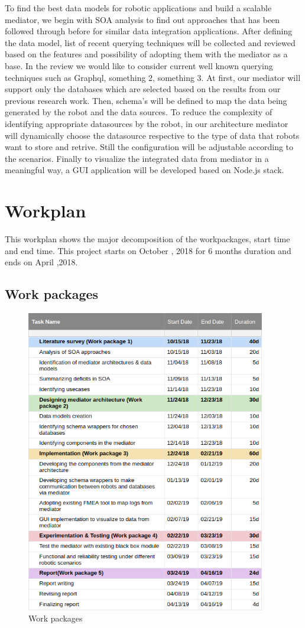 \documentclass[12pt]{article}
\begin{document}
To find the best data models for robotic applications and build a scalable mediator, we begin with SOA analysis to find out approaches that has been followed through before for similar data integration applications. After defining the data model, list of recent querying techniques will be collected and reviewed based on the features and possibility of adopting them with the mediator as a base. In the review we would like to consider current well known querying techniques such as Graphql, something 2, something 3. At first, our mediator will support only the databases which are selected based on the results from our previous research work. Then, schema's will be defined to map the data being generated by the robot and the data sources. To reduce the complexity of identifying appropriate datasources by the robot, in our architecture mediator will dynamically choose the datasource respective to the type of data that robots want to store and retrive. Still the configuration will be adjustable according to the scenarios. Finally to visualize the integrated data from mediator in a meaningful way, a GUI application will be developed based on Node.js stack.

\section{Workplan}
This workplan shows the major decomposition of the workpackages, start time and end time. This project starts on October , 2018 for 6 months duration and ends on April ,2018.

\subsection{Work packages}
\begin{figure}[h!]
  \includegraphics[width=\linewidth,height=13.3cm]{wp_v1.png}
  \caption{Work packages}
  \label{fig:work_packages}
\end{figure}
\end{document}

